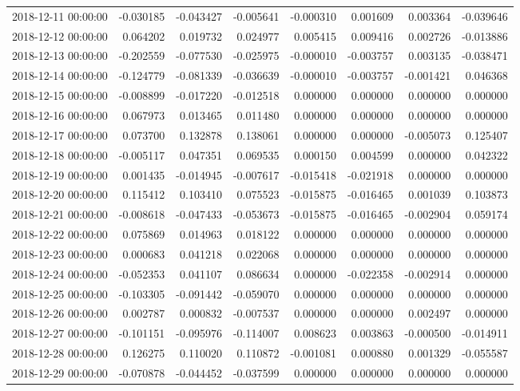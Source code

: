 \begin{tabular}{lrrrrrrr}
2018-12-11 00:00:00 & -0.030185 & -0.043427 & -0.005641 & -0.000310 & 0.001609 & 0.003364 & -0.039646 \\
2018-12-12 00:00:00 & 0.064202 & 0.019732 & 0.024977 & 0.005415 & 0.009416 & 0.002726 & -0.013886 \\
2018-12-13 00:00:00 & -0.202559 & -0.077530 & -0.025975 & -0.000010 & -0.003757 & 0.003135 & -0.038471 \\
2018-12-14 00:00:00 & -0.124779 & -0.081339 & -0.036639 & -0.000010 & -0.003757 & -0.001421 & 0.046368 \\
2018-12-15 00:00:00 & -0.008899 & -0.017220 & -0.012518 & 0.000000 & 0.000000 & 0.000000 & 0.000000 \\
2018-12-16 00:00:00 & 0.067973 & 0.013465 & 0.011480 & 0.000000 & 0.000000 & 0.000000 & 0.000000 \\
2018-12-17 00:00:00 & 0.073700 & 0.132878 & 0.138061 & 0.000000 & 0.000000 & -0.005073 & 0.125407 \\
2018-12-18 00:00:00 & -0.005117 & 0.047351 & 0.069535 & 0.000150 & 0.004599 & 0.000000 & 0.042322 \\
2018-12-19 00:00:00 & 0.001435 & -0.014945 & -0.007617 & -0.015418 & -0.021918 & 0.000000 & 0.000000 \\
2018-12-20 00:00:00 & 0.115412 & 0.103410 & 0.075523 & -0.015875 & -0.016465 & 0.001039 & 0.103873 \\
2018-12-21 00:00:00 & -0.008618 & -0.047433 & -0.053673 & -0.015875 & -0.016465 & -0.002904 & 0.059174 \\
2018-12-22 00:00:00 & 0.075869 & 0.014963 & 0.018122 & 0.000000 & 0.000000 & 0.000000 & 0.000000 \\
2018-12-23 00:00:00 & 0.000683 & 0.041218 & 0.022068 & 0.000000 & 0.000000 & 0.000000 & 0.000000 \\
2018-12-24 00:00:00 & -0.052353 & 0.041107 & 0.086634 & 0.000000 & -0.022358 & -0.002914 & 0.000000 \\
2018-12-25 00:00:00 & -0.103305 & -0.091442 & -0.059070 & 0.000000 & 0.000000 & 0.000000 & 0.000000 \\
2018-12-26 00:00:00 & 0.002787 & 0.000832 & -0.007537 & 0.000000 & 0.000000 & 0.002497 & 0.000000 \\
2018-12-27 00:00:00 & -0.101151 & -0.095976 & -0.114007 & 0.008623 & 0.003863 & -0.000500 & -0.014911 \\
2018-12-28 00:00:00 & 0.126275 & 0.110020 & 0.110872 & -0.001081 & 0.000880 & 0.001329 & -0.055587 \\
2018-12-29 00:00:00 & -0.070878 & -0.044452 & -0.037599 & 0.000000 & 0.000000 & 0.000000 & 0.000000 \\

\end{tabular}
